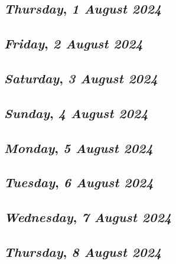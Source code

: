 \begin{center}
\section*{\month}
\end{center}

\def\day{\textit{1 August 2024}}
\def\weekday{\textit{Thursday}}
\subsection*{\weekday, \day}

\def\day{\textit{2 August 2024}}
\def\weekday{\textit{Friday}}
\subsection*{\weekday, \day}

\def\day{\textit{3 August 2024}}
\def\weekday{\textit{Saturday}}
\subsection*{\weekday, \day}

\def\day{\textit{4 August 2024}}
\def\weekday{\textit{Sunday}}
\subsection*{\weekday, \day}

\def\day{\textit{5 August 2024}}
\def\weekday{\textit{Monday}}
\subsection*{\weekday, \day}

\def\day{\textit{6 August 2024}}
\def\weekday{\textit{Tuesday}}
\subsection*{\weekday, \day}

\def\day{\textit{7 August 2024}}
\def\weekday{\textit{Wednesday}}
\subsection*{\weekday, \day}

\def\day{\textit{8 August 2024}}
\def\weekday{\textit{Thursday}}
\subsection*{\weekday, \day}

